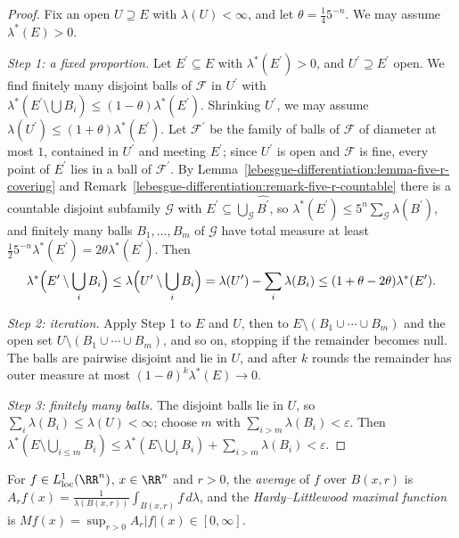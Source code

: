 \begin{proof}
Fix an open $U \supseteq E$ with $\lambda(U) < \infty$, and let $\theta = \frac145^{-n}$. We may assume $\lambda^*(E) > 0$.

\emph{Step 1: a fixed proportion.} Let $E^{\prime} \subseteq E$ with $\lambda^*(E^{\prime}) > 0$, and $U^{\prime} \supseteq E^{\prime}$ open. We find finitely many disjoint balls of $\mathcal{F}$ in $U^{\prime}$ with
$\lambda^*(E^{\prime} \setminus \bigcup B_i) \leq (1 - \theta)\lambda^*(E^{\prime})$. Shrinking $U^{\prime}$, we may assume $\lambda(U^{\prime}) \leq (1 + \theta)\lambda^*(E^{\prime})$. Let $\mathcal{F}^{\prime}$ be the
family of balls of $\mathcal{F}$ of diameter at most $1$, contained in $U^{\prime}$ and meeting $E^{\prime}$; since $U^{\prime}$ is open and $\mathcal{F}$ is fine, every point of $E^{\prime}$ lies in a ball of
$\mathcal{F}^{\prime}$. By Lemma~\ref{lebesgue-differentiation:lemma-five-r-covering} and Remark~\ref{lebesgue-differentiation:remark-five-r-countable} there is a countable disjoint subfamily $\mathcal{G}$ with
$E^{\prime} \subseteq \bigcup_{\mathcal{G}}\widehat{B^{\prime}}$, so $\lambda^*(E^{\prime}) \leq 5^n\sum_{\mathcal{G}}\lambda(B^{\prime})$, and finitely many balls $B_1, \ldots, B_m$ of $\mathcal{G}$ have total measure at
least $\frac125^{-n}\lambda^*(E^{\prime}) = 2\theta\lambda^*(E^{\prime})$. Then
\[
\lambda^*\Bigl(E^{\prime} \setminus \bigcup_iB_i\Bigr) \leq \lambda\Bigl(U^{\prime} \setminus \bigcup_iB_i\Bigr) = \lambda(U^{\prime}) - \sum_i\lambda(B_i) \leq (1 + \theta - 2\theta)\lambda^*(E^{\prime}).
\]

\emph{Step 2: iteration.} Apply Step 1 to $E$ and $U$, then to $E \setminus (B_1 \cup \cdots \cup B_m)$ and the open set $U \setminus (B_1 \cup \cdots \cup B_m)$, and so on, stopping if the remainder becomes null.
The balls are pairwise disjoint and lie in $U$, and after $k$ rounds the remainder has outer measure at most $(1 - \theta)^k\lambda^*(E) \to 0$.

\emph{Step 3: finitely many balls.} The disjoint balls lie in $U$, so $\sum_i\lambda(B_i) \leq \lambda(U) < \infty$; choose $m$ with $\sum_{i > m}\lambda(B_i) < \varepsilon$. Then
$\lambda^*(E \setminus \bigcup_{i \leq m}B_i) \leq \lambda^*(E \setminus \bigcup_iB_i) + \sum_{i > m}\lambda(B_i) < \varepsilon$.
\end{proof}

\begin{definition}\label{lebesgue-differentiation:definition-maximal-function}
For $f \in L^1_{\mathrm{loc}}(\RR^n)$, $x \in \RR^n$ and $r > 0$, the \emph{average} of $f$ over $B(x, r)$ is
$A_rf(x) = \frac{1}{\lambda(B(x, r))}\int_{B(x, r)}f\,d\lambda$, and the \emph{Hardy--Littlewood maximal function} is $Mf(x) = \sup_{r > 0}A_r|f|(x) \in [0, \infty]$.
\end{definition}

